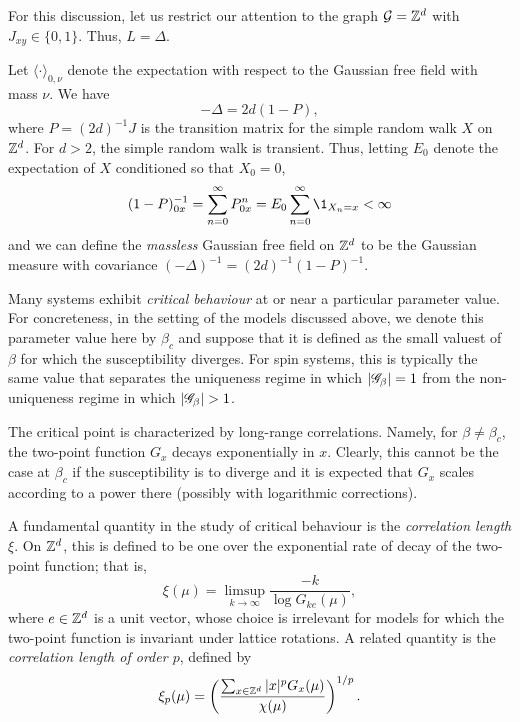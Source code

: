 For this discussion, let us restrict our attention to the graph $\mathcal{G} = { {{\mathbb Z}}^d }$
with $J_{xy} \in \{ 0, 1 \}$. Thus, $L = \Delta$.

\begin{example}
Let $\langle \cdot \rangle_{0,\nu}$ denote the expectation with respect to the
Gaussian free field with mass $\nu$. We have
\begin{equation}
-\Delta = 2 d (1 - P),
\end{equation}
where $P = (2 d)^{-1} J$ is the transition matrix for the simple random walk $X$ on ${ {{\mathbb Z}}^d }$.
For $d > 2$, the simple random walk is transient. Thus, letting $E_0$ denote the expectation
of $X$ conditioned so that $X_0 = 0$,
\begin{equation}
(1 - P)^{-1}_{0x} = \sum_{n=0}^\infty P^n_{0x} = E_0 \sum_{n=0}^\infty \1_{X_n=x} < \infty
\end{equation}
and we can define the \emph{massless} Gaussian free field on ${ {{\mathbb Z}}^d }$ to be the Gaussian
measure with covariance $(-\Delta)^{-1} = (2 d)^{-1} (1 - P)^{-1}$.


\end{example}

Many systems exhibit \emph{critical behaviour} at or near a particular parameter value. For concreteness, in the setting of the models discussed above, we denote this parameter value here by $\beta_c$ and suppose that it is defined as the small valuest of $\beta$ for which the susceptibility diverges. For spin systems, this is typically the same value that separates the uniqueness regime in which $|\mathscr{G}_\beta| = 1$ from the non-uniqueness regime in which
$|\mathscr{G}_\beta| > 1$.

The critical point is characterized by long-range correlations. Namely, for
$\beta \ne \beta_c$, the two-point function $G_x$ decays exponentially in $x$. Clearly, this cannot be the case at $\beta_c$ if the susceptibility is to diverge and it is expected that $G_x$ scales according to a power there 
(possibly with logarithmic corrections).

A fundamental quantity in the study of critical behaviour is the
\emph{correlation length} $\xi$. On ${ {{\mathbb Z}}^d }$, this is defined to be one over the exponential rate of decay of the two-point function; that is,
\begin{equation}
\xi(\mu) = \limsup_{k\to\infty} \frac{-k}{\log G_{ke}(\mu)},
\end{equation}
where $e \in { {{\mathbb Z}}^d }$ is a unit vector, whose choice is irrelevant for models for which the two-point function is invariant under lattice rotations.
A related quantity is the \emph{correlation length of order $p$}, defined by
\begin{equation}
\xi_p(\mu) = \left(\frac{\sum_{x\in{ {{\mathbb Z}}^d }} |x|^p G_x(\mu)}{\chi(\mu)}\right)^{1/p}.
\end{equation}

